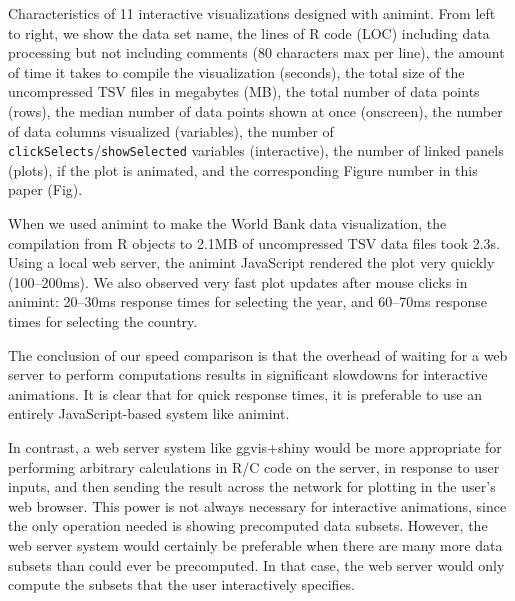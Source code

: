 \documentclass[journal]{vgtc}\usepackage[]{graphicx}\usepackage[]{color}
\begin{document}
\begin{table}[htp] %
  \centering
  
  \vskip 0.2cm
  \caption{Characteristics of 11 interactive visualizations designed with
    animint. From left to right, we show the data set name, the
    lines of R code (LOC) including data processing but not including comments
    (80 characters max per line),
    the amount of time it takes to compile the visualization (seconds),
    the total size of the uncompressed TSV files in megabytes (MB),
    the total number of data points (rows),
    the median number of data points shown at once (onscreen),
    the number of data columns visualized (variables),
    the number of \texttt{clickSelects}/\texttt{showSelected} variables (interactive),
    the number of linked panels (plots),
    if the plot is animated,
    and the corresponding Figure number in this paper (Fig).
  }
\label{tab:examples}
\end{table}

When we used animint to make the World Bank data visualization, the
compilation from R objects to 2.1MB of uncompressed TSV data files
took 2.3s. Using a local web server, the animint JavaScript rendered
the plot very quickly (100--200ms). We also observed very fast plot
updates after mouse clicks in animint: 20--30ms response times for
selecting the year, and 60--70ms response times for selecting the
country.

The conclusion of our speed comparison is that the overhead of waiting
for a web server to perform computations results in significant
slowdowns for interactive animations. It is clear that for quick
response times, it is preferable to use an entirely JavaScript-based
system like animint.

In contrast, a web server system like ggvis+shiny would be more
appropriate for
performing arbitrary calculations in R/C code on the server, in
response to user inputs, and then sending the result across the
network for plotting in the user's web browser. This power is not
always necessary for interactive animations, since the only operation
needed is showing precomputed data subsets. However, the web server
system would certainly be preferable when there are many more data
subsets than could ever be precomputed. In that case, the web server
would only compute the subsets that the user interactively specifies.
\end{document}
